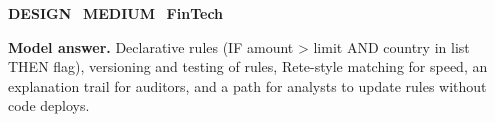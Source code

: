 \documentclass[11pt]{article}
\begin{document}
\begin{tcolorbox}[enhanced,breakable,colback=white,colframe=crimson,arc=2mm,boxrule=0.8pt,left=3mm,right=3mm,
 title={\textbf{QIII.12}\quad Design a rule engine for transaction compliance checks.},fonttitle=\color{white}\small,colbacktitle=crimson]
\colorbox{crimson!15}{\scriptsize\bfseries\color{crimson} DESIGN}\
\colorbox{gold!85!black!15}{\scriptsize\bfseries\color{gold!85!black} MEDIUM}\
\colorbox{navy!8}{\scriptsize\bfseries\color{navy} FinTech}\par\smallskip
\textbf{\color{navy}Model answer.} Declarative rules (IF amount > limit AND country in list THEN flag), versioning and testing of rules, Rete-style matching for speed, an explanation trail for auditors, and a path for analysts to update rules without code deploys.
\end{tcolorbox}
\end{document}
